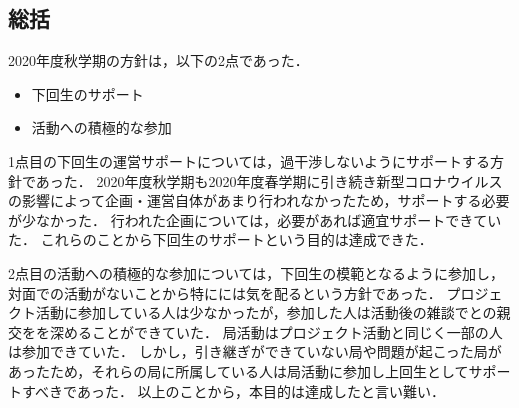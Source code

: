 \subsection*{\thirdGrade{}総括}


2020年度秋学期の\thirdGrade{}方針は，以下の2点であった．
\begin{itemize}
  \item 下回生のサポート
  \item 活動への積極的な参加
\end{itemize}

1点目の下回生の運営サポートについては，過干渉しないようにサポートする方針であった．
2020年度秋学期も2020年度春学期に引き続き新型コロナウイルスの影響によって企画・運営自体があまり行われなかったため，サポートする必要が少なかった．
行われた企画については，必要があれば適宜サポートできていた．
これらのことから下回生のサポートという目的は達成できた．

2点目の活動への積極的な参加については，下回生の模範となるように参加し，対面での活動がないことから特に\firstGrade{}には気を配るという方針であった．
プロジェクト活動に参加している人は少なかったが，参加した人は活動後の雑談で\firstGrade{}との親交をを深めることができていた．
局活動はプロジェクト活動と同じく一部の人は参加できていた．
しかし，引き継ぎができていない局や問題が起こった局があったため，それらの局に所属している人は局活動に参加し上回生としてサポートすべきであった．
以上のことから，本目的は達成したと言い難い．
